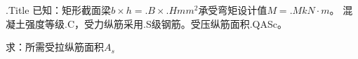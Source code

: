 
\begin{frame}[plain]{ {{.Title}} } \vspace{-0.1em}
	已知：矩形截面梁$b\times h={{.B}}\times {{.H}}mm^2$承受弯矩设计值$M={{.M}}kN\cdot m$。
	混凝土强度等级{{.C}}，受力纵筋采用{{.S}}级钢筋。受压纵筋面积{{.QASc}}。

	求：所需受拉纵筋面积$A_s$
\end{frame}


